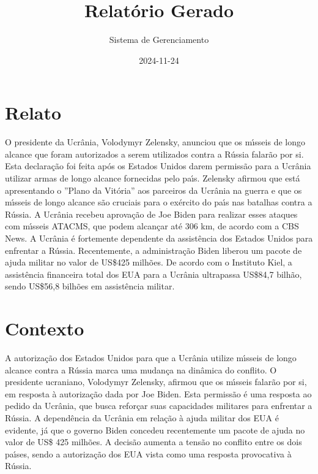 \documentclass[article,11pt,oneside,a4paper,brazil,sumario=tradicional]{abntex2}%
\title{Relatório Gerado}%
\author{Sistema de Gerenciamento}%
\date{2024{-}11{-}24}%
\begin{document}
%
\normalsize%
\maketitle%
%
\frenchspacing%
\section{Relato}%
\label{sec:Relato}%
O presidente da Ucr\^ania, Volodymyr Zelensky, anunciou que os m{\'\i}sseis de longo alcance que foram autorizados a serem utilizados contra a R\'ussia falar\~ao por si. Esta declara\c{c}\~ao foi feita ap\'os os Estados Unidos darem permiss\~ao para a Ucr\^ania utilizar armas de longo alcance fornecidas pelo pa{\'\i}s. Zelensky afirmou que est\'a apresentando o ''Plano da Vit\'oria'' aos parceiros da Ucr\^ania na guerra e que os m{\'\i}sseis de longo alcance s\~ao cruciais para o ex\'ercito do pa{\'\i}s nas batalhas contra a R\'ussia. A Ucr\^ania recebeu aprova\c{c}\~ao de Joe Biden para realizar esses ataques com m{\'\i}sseis ATACMS, que podem alcan\c{c}ar at\'e 306 km, de acordo com a CBS News. A Ucr\^ania \'e fortemente dependente da assist\^encia dos Estados Unidos para enfrentar a R\'ussia. Recentemente, a administra\c{c}\~ao Biden liberou um pacote de ajuda militar no valor de US\$425 milh\~oes. De acordo com o Instituto Kiel, a assist\^encia financeira total dos EUA para a Ucr\^ania ultrapassa US\$84,7 bilh\~ao, sendo US\$56,8 bilh\~oes em assist\^encia militar.

%
\section{Contexto}%
\label{sec:Contexto}%
A autoriza\c{c}\~ao dos Estados Unidos para que a Ucr\^ania utilize m{\'\i}sseis de longo alcance contra a R\'ussia marca uma mudan\c{c}a na din\^amica do conflito. O presidente ucraniano, Volodymyr Zelensky, afirmou que os m{\'\i}sseis falar\~ao por si, em resposta \`a autoriza\c{c}\~ao dada por Joe Biden. Esta permiss\~ao \'e uma resposta ao pedido da Ucr\^ania, que busca refor\c{c}ar suas capacidades militares para enfrentar a R\'ussia. A depend\^encia da Ucr\^ania em rela\c{c}\~ao \`a ajuda militar dos EUA \'e evidente, j\'a que o governo Biden concedeu recentemente um pacote de ajuda no valor de US\$ 425 milh\~oes. A decis\~ao aumenta a tens\~ao no conflito entre os dois pa{\'\i}ses, sendo a autoriza\c{c}\~ao dos EUA vista como uma resposta provocativa \`a R\'ussia.

%
\end{document}
